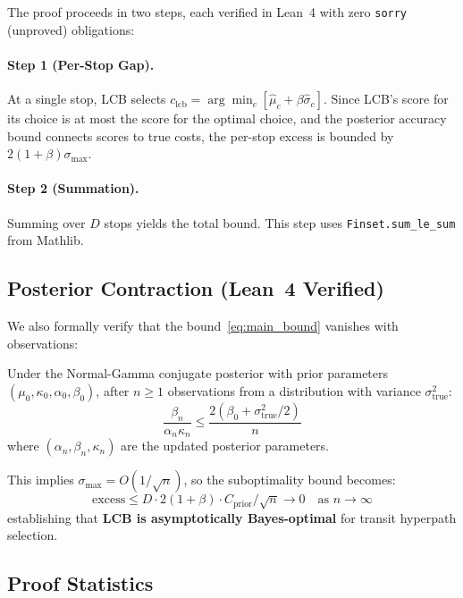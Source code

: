 \documentclass[journal]{IEEEtran}
\begin{document}
The proof proceeds in two steps, each verified in Lean~4 with zero \texttt{sorry} (unproved) obligations:

\paragraph{Step 1 (Per-Stop Gap).} At a single stop, LCB selects $c_{\mathrm{lcb}} = \arg\min_c [\hat{\mu}_c + \beta \hat{\sigma}_c]$. Since LCB's score for its choice is at most the score for the optimal choice, and the posterior accuracy bound connects scores to true costs, the per-stop excess is bounded by $2(1+\beta)\sigma_{\max}$.

\paragraph{Step 2 (Summation).} Summing over $D$ stops yields the total bound. This step uses \texttt{Finset.sum\_le\_sum} from Mathlib.

\subsection{Posterior Contraction (Lean~4 Verified)}

We also formally verify that the bound~\eqref{eq:main_bound} vanishes with observations:

\begin{theorem}
\label{thm:contraction}
Under the Normal-Gamma conjugate posterior with prior parameters $(\mu_0, \kappa_0, \alpha_0, \beta_0)$, after $n \geq 1$ observations from a distribution with variance $\sigma_{\mathrm{true}}^2$:
\begin{equation}
    \frac{\beta_n}{\alpha_n \kappa_n} \leq \frac{2(\beta_0 + \sigma_{\mathrm{true}}^2/2)}{n}
\end{equation}
where $(\alpha_n, \beta_n, \kappa_n)$ are the updated posterior parameters.
\end{theorem}

This implies $\sigma_{\max} = O(1/\sqrt{n})$, so the suboptimality bound becomes:
\begin{equation}
    \mathrm{excess} \leq D \cdot 2(1+\beta) \cdot C_{\mathrm{prior}} / \sqrt{n} \to 0 \quad \text{as } n \to \infty
\end{equation}
establishing that \textbf{LCB is asymptotically Bayes-optimal} for transit hyperpath selection.

\subsection{Proof Statistics}
\end{document}

